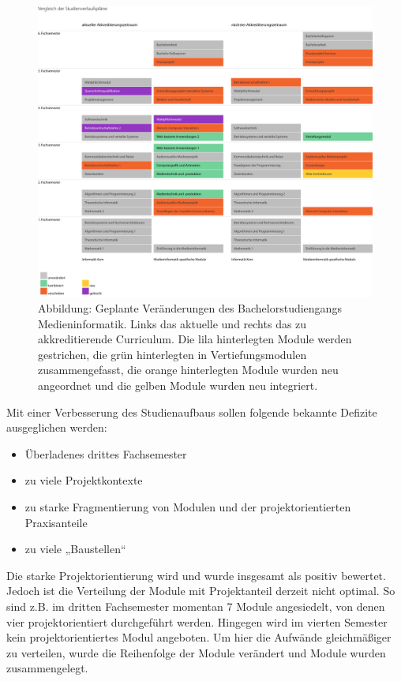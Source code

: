 \begin{figure}[htbp][htbp]
\centering
\includegraphics[width=\columnwidth]{../anhaenge/bilder/ba-veraenderungen-studienverlaufsplan.png}
\caption{Abbildung: Geplante Veränderungen des Bachelorstudiengangs
Medieninformatik. Links das aktuelle und rechts das zu akkreditierende
Curriculum. Die lila hinterlegten Module werden gestrichen, die grün
hinterlegten in Vertiefungsmodulen zusammengefasst, die orange
hinterlegten Module wurden neu angeordnet und die gelben Module wurden
neu integriert.}
\end{figure}

Mit einer Verbesserung des Studienaufbaus sollen folgende bekannte
Defizite ausgeglichen werden:

\begin{itemize}
\tightlist
\item
  Überladenes drittes Fachsemester
\item
  zu viele Projektkontexte
\item
  zu starke Fragmentierung von Modulen und der projektorientierten
  Praxisanteile
\item
  zu viele „Baustellen``
\end{itemize}

Die starke Projektorientierung wird und wurde insgesamt als positiv
bewertet. Jedoch ist die Verteilung der Module mit Projektanteil derzeit
nicht optimal. So sind z.B. im dritten Fachsemester momentan 7 Module
angesiedelt, von denen vier projektorientiert durchgeführt werden.
Hingegen wird im vierten Semester kein projektorientiertes Modul
angeboten. Um hier die Aufwände gleichmäßiger zu verteilen, wurde die
Reihenfolge der Module verändert und Module wurden zusammengelegt.

